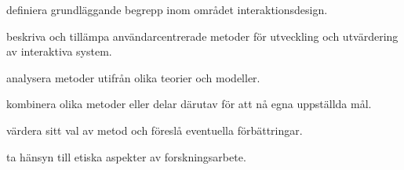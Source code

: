 \item definiera grundläggande begrepp inom området interaktionsdesign.
\item beskriva och tillämpa användarcentrerade metoder för utveckling och 
utvärdering av interaktiva system.
\item analysera metoder utifrån olika teorier och modeller.
\item kombinera olika metoder eller delar därutav för att nå egna uppställda 
mål.
\item värdera sitt val av metod och föreslå eventuella förbättringar.
\item ta hänsyn till etiska aspekter av forskningsarbete.
